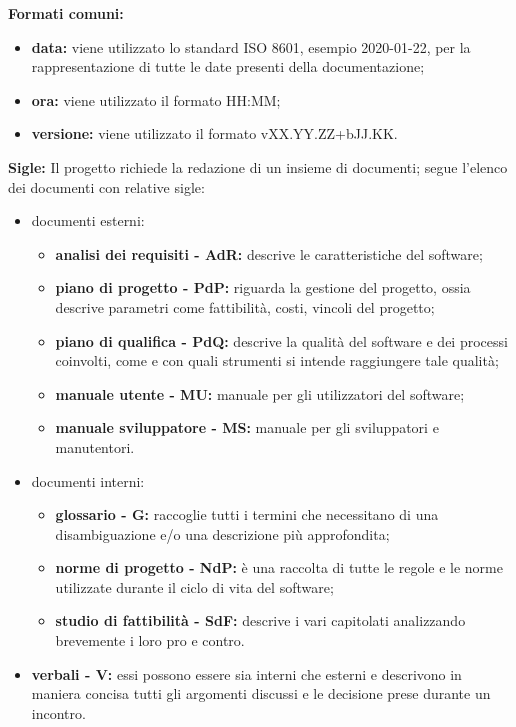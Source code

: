 				\textbf{Formati comuni: }
					\begin{itemize}
						\item \textbf{data:} viene utilizzato lo standard ISO 8601, esempio 2020-01-22, per la rappresentazione di tutte le date presenti della documentazione;
						\item \textbf{ora:} viene utilizzato il formato HH:MM;
						\item \textbf{versione:} viene utilizzato il formato vXX.YY.ZZ+bJJ.KK.
					\end{itemize}
				\textbf{Sigle: }
					Il progetto richiede la redazione di un insieme di documenti; segue l'elenco dei documenti con relative sigle:
					\begin{itemize}
						\item documenti esterni:
							\begin{itemize}
								\item \textbf{analisi dei requisiti - AdR:} descrive le caratteristiche del software;
								\item \textbf{piano di progetto - PdP:} riguarda la gestione del progetto, ossia descrive parametri come fattibilità, costi, vincoli del progetto;
								\item \textbf{piano di qualifica - PdQ:} descrive la qualità del software e dei processi coinvolti, come e con quali strumenti si intende raggiungere tale qualità;
								\item \textbf{manuale utente - MU:} manuale per gli utilizzatori del software;
								\item \textbf{manuale sviluppatore - MS:} manuale per gli sviluppatori e manutentori.
							\end{itemize}
						\item documenti interni:
							\begin{itemize}
								\item \textbf{glossario - G:} raccoglie tutti i termini che necessitano di una disambiguazione e/o una descrizione più approfondita;
								\item \textbf{norme di progetto - NdP:} è una raccolta di tutte le regole e le norme utilizzate durante il ciclo di vita del software;
								\item \textbf{studio di fattibilità - SdF:} descrive i vari capitolati analizzando brevemente i loro pro e contro.
							\end{itemize}
						\item \textbf{verbali - V:} essi possono essere sia interni che esterni e descrivono in maniera concisa tutti gli argomenti discussi e le decisione prese durante un incontro.
					\end{itemize}
